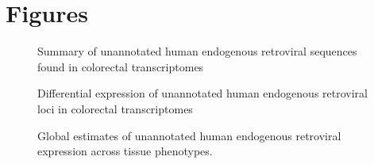 \documentclass[11pt,letterpaper]{article}
\begin{document}
\FloatBarrier
\newpage
\section*{Figures}

\begin{figure}[ht]
  \caption{Summary of unannotated human endogenous retroviral sequences found in colorectal transcriptomes}
  \label{fig:pre_sum}
\end{figure}

\begin{figure}[ht]
  \caption{Differential expression of unannotated human endogenous retroviral loci in colorectal transcriptomes}
  \label{fig:dge_res}
\end{figure}

\begin{figure}[ht]
  \caption{Global estimates of unannotated human endogenous retroviral expression across tissue phenotypes.}
  \label{fig:heat}
\end{figure}
\end{document}
